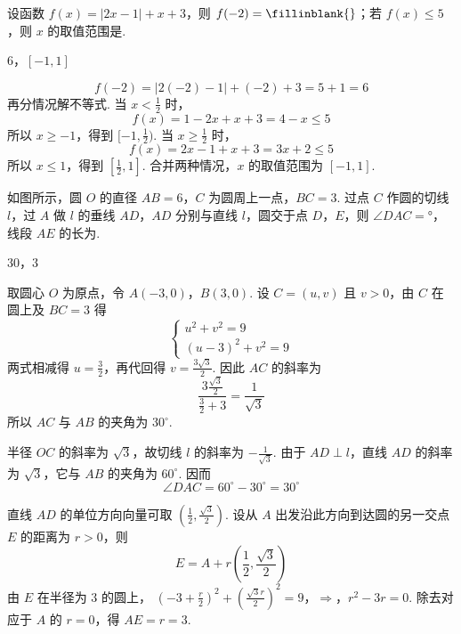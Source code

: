 \begin{problem}
设函数 \( f(x) = |2x - 1| + x + 3 \)，则 \( f(-2) =\fillinblank{} \)；若 \( f(x) \leqslant 5 \)，则 \( x \) 的取值范围是\fillinblank{}.
\end{problem}

\begin{answer}
\(6\)，\([-1,1]\)
\end{answer}

\begin{solution}
\[
f(-2)=|2(-2)-1|+(-2)+3=5+1=6
\]
再分情况解不等式. 当 \(x<\frac12\) 时，
\[
f(x)=1-2x+x+3=4-x\leqslant5
\]
所以 \(x\geqslant-1\)，得到 \([-1,\frac12)\). 当 \(x\geqslant\frac12\) 时，
\[
f(x)=2x-1+x+3=3x+2\leqslant5
\]
所以 \(x\leqslant1\)，得到 \([\frac12,1]\). 合并两种情况，\(x\) 的取值范围为 \([-1,1]\).
\end{solution}

\begin{problem}
如图所示，圆 \(O\) 的直径 \(AB = 6\)，\(C\) 为圆周上一点，\(BC = 3\). 过点 \(C\) 作圆的切线 \(l\)，过 \(A\) 做 \(l\) 的垂线 \(AD\)，\(AD\) 分别与直线 \(l\)，圆交于点 \(D\)，\(E\)，则 \(\angle DAC =\)\fillinblank{}°，线段 \(AE\) 的长为\fillinblank{}.
\end{problem}

\begin{answer}
\(30\)，\(3\)
\end{answer}

\begin{solution}
取圆心 \(O\) 为原点，令 \(A(-3,0)\)，\(B(3,0)\). 设 \(C=(u,v)\) 且 \(v>0\)，由 \(C\) 在圆上及 \(BC=3\) 得
\[
\begin{cases}
u^2+v^2=9\\
(u-3)^2+v^2=9
\end{cases}
\]
两式相减得 \(u=\frac32\)，再代回得 \(v=\frac{3\sqrt3}{2}\). 因此 \(AC\) 的斜率为
\[
\frac{3\frac{\sqrt3}{2}}{\frac{3}{2}+3}=\frac1{\sqrt3}
\]
所以 \(AC\) 与 \(AB\) 的夹角为 \(30^{\circ}\).

半径 \(OC\) 的斜率为 \(\sqrt3\)，故切线 \(l\) 的斜率为 \(-\frac1{\sqrt3}\). 由于 \(AD\perp l\)，直线 \(AD\) 的斜率为 \(\sqrt3\)，它与 \(AB\) 的夹角为 \(60^{\circ}\). 因而
\[
\angle DAC=60^{\circ}-30^{\circ}=30^{\circ}
\]

直线 \(AD\) 的单位方向向量可取 \(\left(\frac12,\frac{\sqrt3}{2}\right)\). 设从 \(A\) 出发沿此方向到达圆的另一交点 \(E\) 的距离为 \(r>0\)，则
\[
E=A+r\left(\frac12,\frac{\sqrt3}{2}\right)
\]
由 \(E\) 在半径为 \(3\) 的圆上，
\(\left(-3+\frac r2\right)^2+\left(\frac{\sqrt3 r}{2}\right)^2=9\)，\(\Longrightarrow\)，\(r^2-3r=0\).
除去对应于 \(A\) 的 \(r=0\)，得 \(AE=r=3\).
\end{solution}

